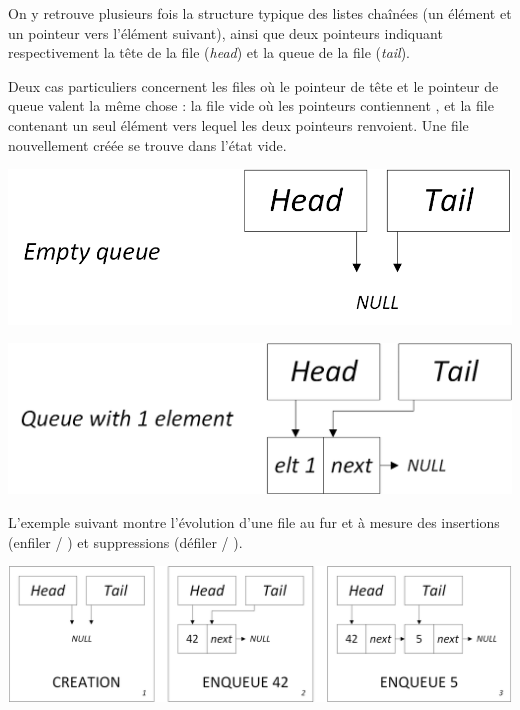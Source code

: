 \smallskip

On y retrouve plusieurs fois la structure typique des listes chaînées (un élément et un pointeur vers l'élément suivant), ainsi que deux pointeurs indiquant respectivement la tête de la file (\textit{head}) et la queue de la file (\textit{tail}).

Deux cas particuliers concernent les files où le pointeur de tête et le pointeur de queue valent la même chose : la file vide où les pointeurs contiennent , et la file contenant un seul élément vers lequel les deux pointeurs renvoient.
Une file nouvellement créée se trouve dans l'état vide.\\

\begin{center}
\includegraphics[scale=0.75]{Cours/Files_3_Liste_Chainee_Structure_cas_vide_etiquette.png}
\end{center}

\smallskip

\begin{center}
\includegraphics[scale=0.75]{Cours/Files_3_Liste_Chainee_Structure_cas_1_elt_etiquette.png}
\end{center}

\smallskip

L'exemple suivant montre l'évolution d'une file au fur et à mesure des insertions (enfiler / ) et suppressions (défiler / ).\\

\begin{center}
\includegraphics[scale=0.60]{Cours/Files_4_Liste_Chainee_Usage_pack_1.png}
\end{center}

